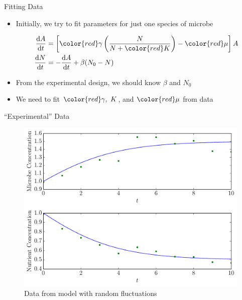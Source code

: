 \documentclass[ignorenonframetext,]{beamer}
\newcommand*\diff{\mathop{}\!\mathrm{d}}
\newcommand*\red{\color{red}}
\begin{document}
\begin{frame}{Fitting Data}

\begin{itemize}
\itemsep1pt\parskip0pt
\item
  Initially, we try to fit parameters for just one species of microbe

  \begin{align*}
  \frac{\diff A}{\diff t} &= \left[ {\red \gamma} \left( \frac{N}{N +
  {\color{red} K}}\right) - {\red \mu} \right]A \\
  \frac{\diff N}{\diff t} &= - \frac{\diff A}{\diff t} + 
  \beta(N_0 - N)
  \end{align*}
\item
  From the experimental design, we should know \(\beta\) and \(N_0\)
\item
  We need to fit \({\red \gamma, \ K}\), and \({\red \mu}\) from data
\end{itemize}

\end{frame}

\begin{frame}{``Experimental'' Data}

\begin{figure}[htbp]
\centering
\includegraphics{one_microbe.pdf}
\caption{Data from model with random fluctuations}
\end{figure}

\end{frame}
\end{document}
